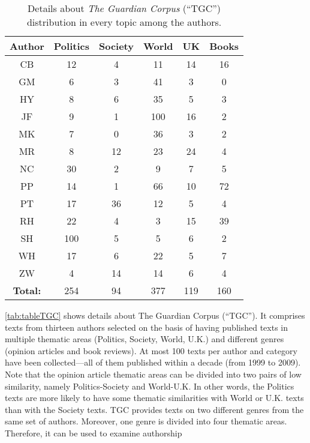 \begin{table}[h!]
	\begin{center}  
		\caption[The Guardian Corpus topics distribution details]{Details about \textit{The Guardian Corpus} (\enquote{TGC}) distribution in every topic among the authors.} 
		\label{tab:tableTGC}
		\begin{tabular}{|c | c | c | c | c | c |}
			\hline 
			Author & Politics & Society & World & UK & Books \\
			\hline \hline
			CB & 12 & 4 & 11 & 14 & 16 \\ \hline
			GM & 6 & 3 & 41 & 3 & 0 \\ \hline
			HY & 8 & 6 & 35 & 5 & 3 \\ \hline
			JF & 9 & 1 & 100 & 16 & 2 \\ \hline
			MK & 7 & 0 & 36 & 3 & 2 \\ \hline
			MR & 8 & 12 & 23 & 24 & 4 \\ \hline
			NC & 30 & 2 & 9 & 7 & 5 \\ \hline
			PP & 14 & 1 & 66 & 10 & 72 \\ \hline
			PT & 17 & 36 & 12 & 5 & 4 \\ \hline
			RH & 22 & 4 & 3 & 15 & 39 \\ \hline
			SH & 100 & 5 & 5 & 6 & 2 \\ \hline
			WH & 17 & 6 & 22 & 5 & 7 \\ \hline
			ZW & 4 & 14 & 14 & 6 & 4 \\ \hline
			\textbf{Total:} & 254 & 94 & 377 & 119 & 160 \\ \hline
		\end{tabular} 
	\end{center}
\end{table}
\autoref{tab:tableTGC} shows details about The Guardian Corpus (“TGC”). It comprises texts from thirteen authors selected on the basis of having published texts in multiple thematic areas (Politics,
Society, World, U.K.) and different genres (opinion articles and book reviews). At most 100 texts per author and category have been collected—all of them published within a decade (from
1999 to 2009). Note that the opinion article thematic areas can be divided into two pairs of low similarity, namely Politics-Society and World-U.K. In other words, the Politics texts are more likely to have some thematic similarities with World or U.K. texts than with the Society texts.
TGC provides texts on two different genres from the same set of authors. Moreover, one genre is divided into four thematic areas. Therefore, it can be used to examine authorship
